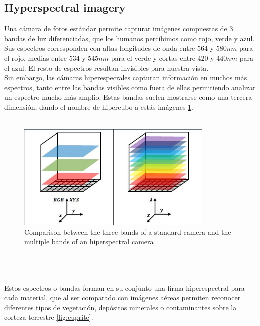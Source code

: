 \subsection{Hyperspectral imagery}
Una cámara de fotos estándar permite capturar imágenes compuestas de 3 bandas de luz diferenciadas, que los humanos percibimos como rojo, verde y azul. Sus espectros corresponden con altas longitudes de onda entre $564$ y $580 nm$ para el rojo, medias  entre $534$ y $545 nm$ para el verde y cortas entre $420$ y $440 nm$ para el azul. El resto de espectros resultan invisibles para nuestra vista.
\\
Sin embargo, las cámaras hiperespecrales capturan información en muchos más espectros, tanto entre las bandas visibles como fuera de ellas permitiendo analizar un espectro mucho más amplio. Estas bandas suelen mostrarse como una tercera dimensión, dando el nombre de hipercubo a estás imágenes \ref{fig:cube}.
\\
\\
\begin{figure}[h!]
\centering
\includegraphics[height=2in]{figures/rgb_vs_hsi.jpeg}
\caption{Comparison between the three bands of a standard camera and the multiple bands of an hiperspectral camera}
  \label{fig:cube}
\end{figure}
\\
\\
\\
Estos espectros o bandas forman en su conjunto una firma hiperespectral para cada material, que al ser comparado con imágenes aéreas permiten reconocer diferentes tipos de vegetación, depósitos minerales o contaminantes sobre la corteza terrestre \ref{fig:cuprite}.
\\
\\
